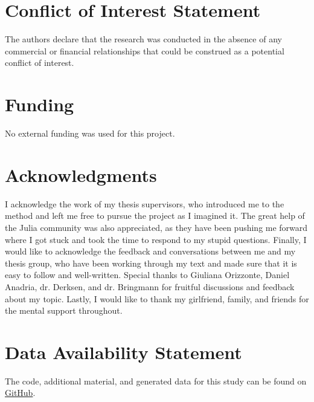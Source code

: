 \documentclass[utf8]{FrontiersinVancouver}
\begin{document}



\section*{Conflict of Interest Statement}
The authors declare that the research was conducted in the absence of any commercial or financial relationships that could be construed as a potential conflict of interest.

\section*{Funding}
No external funding was used for this project.

\section*{Acknowledgments}
I acknowledge the work of my thesis supervisors, who introduced me to the method and left me free to pursue the project as I imagined it. The great help of the Julia community was also appreciated, as they have been pushing me forward where I got stuck and took the time to respond to my stupid questions. Finally, I would like to acknowledge the feedback and conversations between me and my thesis group, who have been working through my text and made sure that it is easy to follow and well-written. Special thanks to Giuliana Orizzonte, Daniel Anadria, dr. Derksen, and dr. Bringmann for fruitful discussions and feedback about my topic. Lastly, I would like to thank my girlfriend, family, and friends for the mental support throughout.

\section*{Data Availability Statement}
The code, additional material, and generated data for this study can be found on \href{https://github.com/MvanSteenbergen/MasterThesisRQA}{GitHub}.
\end{document}
